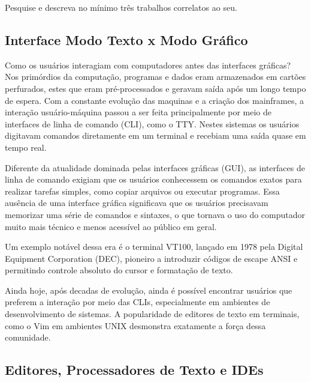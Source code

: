 Pesquise e descreva no mínimo três trabalhos correlatos ao seu.

\subsection{Interface Modo Texto x Modo Gráfico}



Como os usuários interagiam com computadores antes das interfaces gráficas? Nos primórdios da computação, programas e dados eram armazenados em cartões
perfurados, estes que eram pré-processados e geravam saída após um longo tempo de espera. Com a constante evolução das maquinas e a criação dos mainframes, a
interação usuário-máquina passou a ser  feita principalmente por meio de interfaces de linha de comando (CLI), como o TTY. Nestes sistemas os usuários digitavam
comandos diretamente em um terminal e recebiam uma saída quase em tempo real.

Diferente da atualidade dominada pelas interfaces gráficas (GUI), as interfaces de linha de comando
exigiam que os usuários conhecessem os comandos exatos para realizar tarefas simples, como copiar arquivos ou executar programas. Essa ausência de uma interface
gráfica significava que os usuários precisavam memorizar uma série de comandos e sintaxes, o que tornava o uso do computador muito mais técnico e menos acessível
ao público em geral.

Um exemplo notável dessa era é o terminal VT100, lançado em 1978 pela Digital Equipment Corporation (DEC), pioneiro a introduzir códigos de escape ANSI e
permitindo controle absoluto do cursor e formatação de texto.

Ainda hoje, após decadas de evolução, ainda é possível encontrar usuários que preferem a interação por meio das CLIs, especialmente em ambientes
de desenvolvimento de sistemas. A popularidade de editores de texto em terminais, como o Vim em ambientes UNIX desmonstra exatamente a força dessa comunidade.


\subsection{Editores, Processadores de Texto e IDEs}

